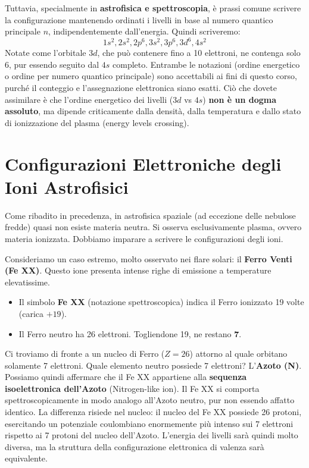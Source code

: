 Tuttavia, specialmente in \textbf{astrofisica e spettroscopia}, è prassi comune scrivere la configurazione mantenendo ordinati i livelli in base al numero quantico principale $n$, indipendentemente dall'energia. Quindi scriveremo:
\begin{equation}
1s^2 , 2s^2 , 2p^6 , 3s^2 , 3p^6 , 3d^6 , 4s^2
\end{equation}
Notate come l'orbitale $3d$, che può contenere fino a 10 elettroni, ne contenga solo 6, pur essendo seguito dal $4s$ completo. Entrambe le notazioni (ordine energetico o ordine per numero quantico principale) sono accettabili ai fini di questo corso, purché il conteggio e l'assegnazione elettronica siano esatti.
Ciò che dovete assimilare è che l'ordine energetico dei livelli ($3d$ vs $4s$) \textbf{non è un dogma assoluto}, ma dipende criticamente dalla densità, dalla temperatura e dallo stato di ionizzazione del plasma (energy levels crossing).

\section{Configurazioni Elettroniche degli Ioni Astrofisici}

Come ribadito in precedenza, in astrofisica spaziale (ad eccezione delle nebulose fredde) quasi non esiste materia neutra. Si osserva esclusivamente plasma, ovvero materia ionizzata. Dobbiamo imparare a scrivere le configurazioni degli ioni.

Consideriamo un caso estremo, molto osservato nei flare solari: il \textbf{Ferro Venti (Fe XX)}.
Questo ione presenta intense righe di emissione a temperature elevatissime.
\begin{itemize}
\item Il simbolo \textbf{Fe XX} (notazione spettroscopica) indica il Ferro ionizzato 19 volte (carica \textbf{$+19$}).
\item Il Ferro neutro ha 26 elettroni. Togliendone 19, ne restano \textbf{7}.
\end{itemize}

Ci troviamo di fronte a un nucleo di Ferro ($Z=26$) attorno al quale orbitano solamente 7 elettroni.
Quale elemento neutro possiede 7 elettroni? L'\textbf{Azoto (N)}.
Possiamo quindi affermare che il Fe XX appartiene alla \textbf{sequenza isoelettronica dell'Azoto} (Nitrogen-like ion).
Il Fe XX si comporta spettroscopicamente in modo analogo all'Azoto neutro, pur non essendo affatto identico. La differenza risiede nel nucleo: il nucleo del Fe XX possiede 26 protoni, esercitando un potenziale coulombiano enormemente più intenso sui 7 elettroni rispetto ai 7 protoni del nucleo dell'Azoto. L'energia dei livelli sarà quindi molto diversa, ma la struttura della configurazione elettronica di valenza sarà equivalente.

